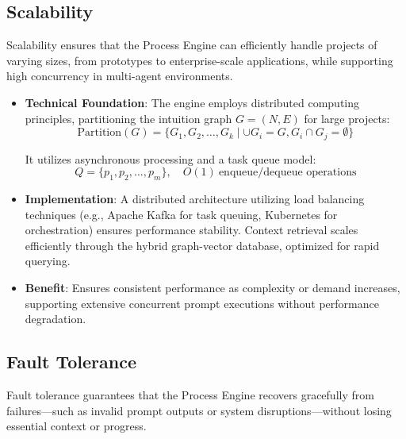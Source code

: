 \documentclass[11pt,a4paper]{article}
\begin{document}
\subsection{Scalability}
\label{subsec:scalability}

Scalability ensures that the Process Engine can efficiently handle projects of varying sizes, from prototypes to enterprise-scale applications, while supporting high concurrency in multi-agent environments.

\begin{itemize}
    \item \textbf{Technical Foundation}:
    The engine employs distributed computing principles, partitioning the intuition graph \( G = (N, E) \) for large projects:
    \[
    \text{Partition}(G) = \{ G_1, G_2, \dots, G_k \mid \cup G_i = G, G_i \cap G_j = \emptyset \}
    \]

    It utilizes asynchronous processing and a task queue model:
    \[
    Q = \{ p_1, p_2, \dots, p_m \}, \quad O(1)\ \text{enqueue/dequeue operations}
    \]

    \item \textbf{Implementation}:
    A distributed architecture utilizing load balancing techniques (e.g., Apache Kafka for task queuing, Kubernetes for orchestration) ensures performance stability. Context retrieval scales efficiently through the hybrid graph-vector database, optimized for rapid querying.

    \item \textbf{Benefit}:
    Ensures consistent performance as complexity or demand increases, supporting extensive concurrent prompt executions without performance degradation.
\end{itemize}

\subsection{Fault Tolerance}
\label{subsec:fault_tolerance}

Fault tolerance guarantees that the Process Engine recovers gracefully from failures—such as invalid prompt outputs or system disruptions—without losing essential context or progress.
\end{document}
